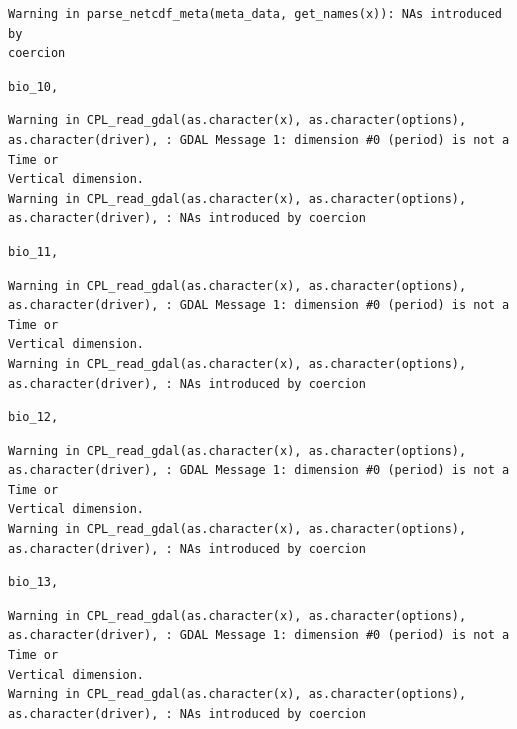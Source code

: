 \documentclass[
  authoryear,
  preprint]{elsarticle}
\begin{document}
\begin{verbatim}
Warning in parse_netcdf_meta(meta_data, get_names(x)): NAs introduced by
coercion
\end{verbatim}

\begin{verbatim}
bio_10, 
\end{verbatim}

\begin{verbatim}
Warning in CPL_read_gdal(as.character(x), as.character(options),
as.character(driver), : GDAL Message 1: dimension #0 (period) is not a Time or
Vertical dimension.
Warning in CPL_read_gdal(as.character(x), as.character(options),
as.character(driver), : NAs introduced by coercion
\end{verbatim}

\begin{verbatim}
bio_11, 
\end{verbatim}

\begin{verbatim}
Warning in CPL_read_gdal(as.character(x), as.character(options),
as.character(driver), : GDAL Message 1: dimension #0 (period) is not a Time or
Vertical dimension.
Warning in CPL_read_gdal(as.character(x), as.character(options),
as.character(driver), : NAs introduced by coercion
\end{verbatim}

\begin{verbatim}
bio_12, 
\end{verbatim}

\begin{verbatim}
Warning in CPL_read_gdal(as.character(x), as.character(options),
as.character(driver), : GDAL Message 1: dimension #0 (period) is not a Time or
Vertical dimension.
Warning in CPL_read_gdal(as.character(x), as.character(options),
as.character(driver), : NAs introduced by coercion
\end{verbatim}

\begin{verbatim}
bio_13, 
\end{verbatim}

\begin{verbatim}
Warning in CPL_read_gdal(as.character(x), as.character(options),
as.character(driver), : GDAL Message 1: dimension #0 (period) is not a Time or
Vertical dimension.
Warning in CPL_read_gdal(as.character(x), as.character(options),
as.character(driver), : NAs introduced by coercion
\end{verbatim}
\end{document}
